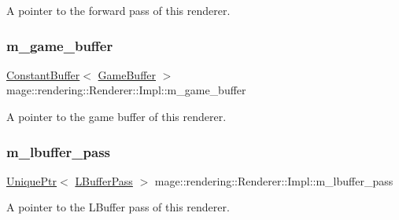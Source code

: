 A pointer to the forward pass of this renderer. \hypertarget{classmage_1_1rendering_1_1_renderer_1_1_impl_a31c129ce1fe4b65b3e4a4ad3d33270df}{}\label{classmage_1_1rendering_1_1_renderer_1_1_impl_a31c129ce1fe4b65b3e4a4ad3d33270df} 
\subsubsection{\texorpdfstring{m\+\_\+game\+\_\+buffer}{m\_game\_buffer}}
{\footnotesize\ttfamily \hyperlink{classmage_1_1rendering_1_1_constant_buffer}{Constant\+Buffer}$<$ \hyperlink{structmage_1_1rendering_1_1_game_buffer}{Game\+Buffer} $>$ mage\+::rendering\+::\+Renderer\+::\+Impl\+::m\+\_\+game\+\_\+buffer\hspace{0.3cm}{\ttfamily [private]}}

A pointer to the game buffer of this renderer. \hypertarget{classmage_1_1rendering_1_1_renderer_1_1_impl_a82455409a99a11e84de943181138e33e}{}\label{classmage_1_1rendering_1_1_renderer_1_1_impl_a82455409a99a11e84de943181138e33e} 
\subsubsection{\texorpdfstring{m\+\_\+lbuffer\+\_\+pass}{m\_lbuffer\_pass}}
{\footnotesize\ttfamily \hyperlink{namespacemage_a3316d7143a973e37adf1110f2e80ca31}{Unique\+Ptr}$<$ \hyperlink{classmage_1_1rendering_1_1_l_buffer_pass}{L\+Buffer\+Pass} $>$ mage\+::rendering\+::\+Renderer\+::\+Impl\+::m\+\_\+lbuffer\+\_\+pass\hspace{0.3cm}{\ttfamily [private]}}

A pointer to the L\+Buffer pass of this renderer. \hypertarget{classmage_1_1rendering_1_1_renderer_1_1_impl_a177cc2fc2cab6c39fc26046e1bea8b97}{}\label{classmage_1_1rendering_1_1_renderer_1_1_impl_a177cc2fc2cab6c39fc26046e1bea8b97} 
